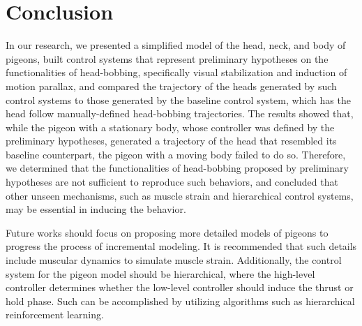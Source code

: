 \chapter{Conclusion} \label{ch:conclusion}
In our research, we presented a simplified model of the head, neck, and body of pigeons, built control systems that represent preliminary hypotheses on the functionalities of head-bobbing, specifically visual stabilization and induction of motion parallax, and compared the trajectory of the heads generated by such control systems to those generated by the baseline control system, which has the head follow manually-defined head-bobbing trajectories.
The results showed that, while the pigeon with a stationary body, whose controller was defined by the preliminary hypotheses, generated a trajectory of the head that resembled its baseline counterpart, the pigeon with a moving body failed to do so.
Therefore, we determined that the functionalities of head-bobbing proposed by preliminary hypotheses are not sufficient to reproduce such behaviors, and concluded that other unseen mechanisms, such as muscle strain and hierarchical control systems, may be essential in inducing the behavior.

Future works should focus on proposing more detailed models of pigeons to progress the process of incremental modeling.
It is recommended that such details include muscular dynamics to simulate muscle strain.
Additionally, the control system for the pigeon model should be hierarchical, where the high-level controller determines whether the low-level controller should induce the thrust or hold phase.
Such can be accomplished by utilizing algorithms such as hierarchical reinforcement learning.
